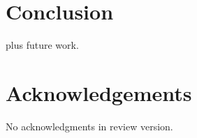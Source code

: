 \documentclass[review]{acmsiggraph}
\begin{document}
\section{Conclusion}
plus future work.

\section*{Acknowledgements}

No acknowledgments in review version.



\end{document}
